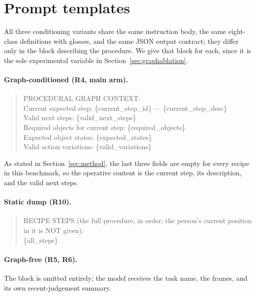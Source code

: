 \documentclass[10pt,twocolumn]{article}
\begin{document}



\appendix

\section{Prompt templates}
\label{app:prompts}

All three conditioning variants share the same instruction body, the same
eight-class definitions with glosses, and the same JSON output contract; they
differ only in the block describing the procedure. We give that block for each,
since it is the sole experimental variable in Section~\ref{sec:graphablation}.

\paragraph{Graph-conditioned (R4, main arm).}
\begin{quote}\footnotesize\ttfamily
PROCEDURAL GRAPH CONTEXT:\\
Current expected step: \{current\_step\_id\} --- \{current\_step\_desc\}\\
Valid next steps: \{valid\_next\_steps\}\\
Required objects for current step: \{required\_objects\}\\
Expected object states: \{expected\_states\}\\
Valid action variations: \{valid\_variations\}
\end{quote}
As stated in Section~\ref{sec:method}, the last three fields are empty for every
recipe in this benchmark, so the operative content is the current step, its
description, and the valid next steps.

\paragraph{Static dump (R10).}
\begin{quote}\footnotesize\ttfamily
RECIPE STEPS (the full procedure, in order; the person's current position in it
is NOT given):\\
\{all\_steps\}
\end{quote}

\paragraph{Graph-free (R5, R6).} The block is omitted entirely; the model
receives the task name, the frames, and its own recent-judgement summary.
\end{document}
